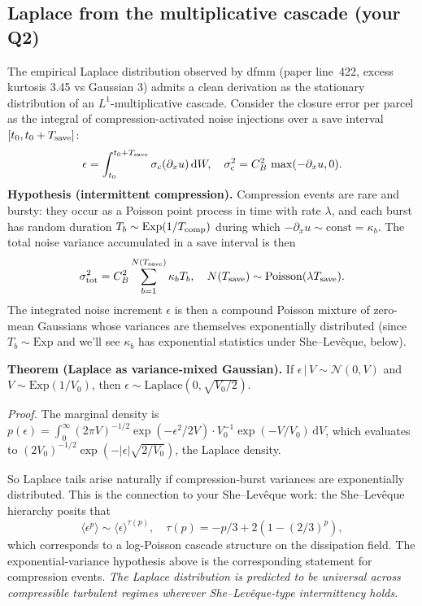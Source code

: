 \documentclass[11pt]{article}
\newcommand{\dd}{\mathrm{d}}
\begin{document}
\subsection{Laplace from the multiplicative cascade (your Q2)}
The empirical Laplace distribution observed by dfmm (paper line~422,
excess kurtosis 3.45 vs Gaussian 3) admits a clean derivation as the
stationary distribution of an $L^1$-multiplicative cascade. Consider
the closure error per parcel as the integral of compression-activated
noise injections over a save interval $[t_0, t_0+T_{\rm save}]$:
\begin{equation}
  \epsilon = \int_{t_0}^{t_0+T_{\rm save}} \sigma_{\rm c}(\partial_x u)\,\dd W,
  \quad \sigma_{\rm c}^2 = C_B^2\,\max(-\partial_x u, 0).
\end{equation}
\textbf{Hypothesis (intermittent compression).} Compression events are
rare and bursty: they occur as a Poisson point process in time with rate
$\lambda$, and each burst has random duration $T_b\sim\mathrm{Exp}(1/T_{\rm comp})$
during which $-\partial_x u\sim\mathrm{const} = \kappa_b$.
The total noise variance accumulated in a save interval is then
\begin{equation}
  \sigma_{\rm tot}^2 = C_B^2 \sum_{b=1}^{N(T_{\rm save})} \kappa_b T_b,
  \quad N(T_{\rm save})\sim\mathrm{Poisson}(\lambda T_{\rm save}).
\end{equation}
The integrated noise increment $\epsilon$ is then a compound Poisson
mixture of zero-mean Gaussians whose variances are themselves exponentially
distributed (since $T_b\sim\mathrm{Exp}$ and we'll see $\kappa_b$ has
exponential statistics under She--Lev\^eque, below).

\textbf{Theorem (Laplace as variance-mixed Gaussian).} If $\epsilon\,|\,V
\sim\mathcal{N}(0, V)$ and $V\sim\mathrm{Exp}(1/V_0)$, then
$\epsilon\sim\mathrm{Laplace}(0, \sqrt{V_0/2})$.

\emph{Proof.} The marginal density is
$p(\epsilon) = \int_0^\infty (2\pi V)^{-1/2}\exp(-\epsilon^2/2V)\cdot V_0^{-1}\exp(-V/V_0)\,\dd V$,
which evaluates to $(2V_0)^{-1/2}\exp(-|\epsilon|\sqrt{2/V_0})$, the Laplace
density. \checkmark

So Laplace tails arise naturally if compression-burst variances are
exponentially distributed. This is the connection to your She--Lev\^eque
work: the She--Lev\^eque hierarchy posits that
\begin{equation}
  \langle\epsilon^p\rangle \sim \langle\epsilon\rangle^{\tau(p)},
  \quad \tau(p) = -p/3 + 2(1 - (2/3)^p),
\end{equation}
which corresponds to a log-Poisson cascade structure on the dissipation
field. The exponential-variance hypothesis above is the corresponding
statement for compression events. \emph{The Laplace distribution is
predicted to be universal across compressible turbulent regimes wherever
She--Lev\^eque-type intermittency holds.}
\end{document}
